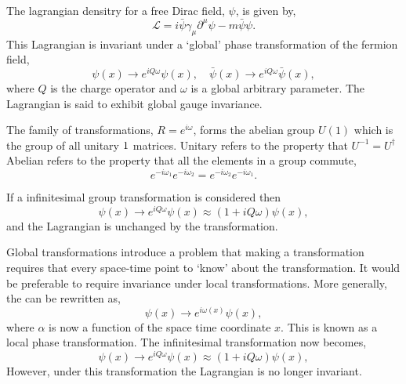 The lagrangian densitry for a free Dirac field, $\psi$, is given by,
\begin{equation}
\mathcal{L} = i \bar{\psi} \gamma_{\mu} \partial^{\mu} \psi - m \bar{\psi}\psi .
\end{equation}
This Lagrangian is invariant under a `global' phase transformation of the
fermion field,
\begin{equation}
\psi(x) \to e^{iQ\omega} \psi(x), \quad \bar{\psi}(x) \to e^{iQ\omega}\bar{\psi}(x),
\label{eq:global}
\end{equation}
where $Q$ is the charge operator and $\omega$ is a global arbitrary parameter. 
The Lagrangian is said to exhibit global gauge invariance. 

The family of transformations, $R = e^{i \omega}$, forms the
abelian group $U(1)$ which is the group of all unitary $1\time1$ matrices.
Unitary refers to the property that $U^{-1} = {U}^{\dagger}$
Abelian refers to the property that all the elements in a
group commute, 
\begin{equation}
e^{-i\omega_1} 
e^{-i\omega_2} 
=
e^{-i\omega_2} 
e^{-i\omega_1} .
\end{equation}

If a infinitesimal group transformation is considered then 
\begin{equation}
\psi(x) 
\to e^{iQ\omega} \psi(x)
\approx (1+iQ\omega)\psi(x),
\end{equation}
and the Lagrangian is unchanged by the transformation.

Global transformations introduce a problem that making a transformation requires
that every space-time point to `know' about the transformation. It would be
preferable to require invariance under local transformations.
More generally, the  can be rewritten as,
\begin{equation}
\psi(x) \to e^{i\omega(x)} \psi(x),
\label{eq:local}
\end{equation}
where $\alpha$ is now a function of the space time coordinate $x$. This is known
as a local phase transformation. The infinitesimal transformation now becomes,
\begin{equation}
\psi(x) 
\to e^{iQ\omega} \psi(x)
\approx (1+iQ\omega)\psi(x),
\end{equation}
However, under this transformation the
Lagrangian is no longer invariant. 

